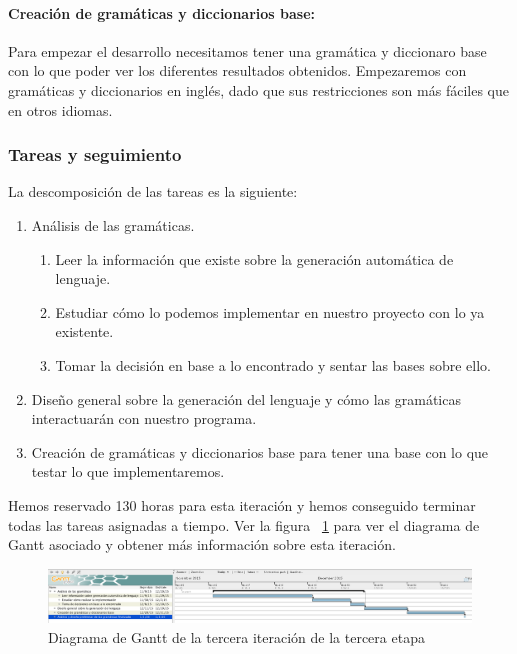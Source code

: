 \paragraph{Creación de gramáticas y diccionarios base:} Para empezar el desarrollo necesitamos tener una gramática y diccionaro base con lo que poder ver los diferentes resultados obtenidos. Empezaremos con gramáticas y diccionarios en inglés, dado que sus restricciones son más fáciles que en otros idiomas.

\subsubsection{Tareas y seguimiento}

La descomposición de las tareas es la siguiente:

\begin{enumerate}[label=\bfseries WBS 3.\arabic*]
  \item Análisis de las gramáticas.
    \begin{enumerate}[label=\bfseries WBS 3.1.\arabic*]
      \item Leer la información que existe sobre la generación automática de lenguaje.
      \item Estudiar cómo lo podemos implementar en nuestro proyecto con lo ya existente.
      \item Tomar la decisión en base a lo encontrado y sentar las bases sobre ello.
    \end{enumerate}
  \item Diseño general sobre la generación del lenguaje y cómo las gramáticas interactuarán con nuestro programa.
  \item Creación de gramáticas y diccionarios base para tener una base con lo que testar lo que implementaremos.
\end{enumerate}

Hemos reservado 130 horas para esta iteración y hemos conseguido terminar todas las tareas asignadas a tiempo. Ver la figura ~\ref{fig:sec3it3} para ver el diagrama de Gantt asociado y obtener más información sobre esta iteración.

\begin{figure}
    \includegraphics[width=\textwidth,height=\textheight,keepaspectratio]{./img/sec3it3.png}
  \caption{Diagrama de Gantt de la tercera iteración de la tercera etapa}
  \label{fig:sec3it3}
\end{figure}

